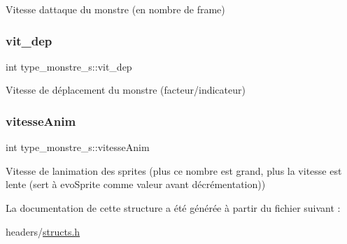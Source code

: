 Vitesse d\textquotesingle{}attaque du monstre (en nombre de frame) \mbox{\label{structtype__monstre__s_a768470695da3d9377f1e7e97a3c45ed7}} 
\subsubsection{\texorpdfstring{vit\+\_\+dep}{vit\_dep}}
{\footnotesize\ttfamily int type\+\_\+monstre\+\_\+s\+::vit\+\_\+dep}

Vitesse de déplacement du monstre (facteur/indicateur) \mbox{\label{structtype__monstre__s_a125257fd616cb7a0a4c82ae30f7d849e}} 
\subsubsection{\texorpdfstring{vitesse\+Anim}{vitesseAnim}}
{\footnotesize\ttfamily int type\+\_\+monstre\+\_\+s\+::vitesse\+Anim}

Vitesse de l\textquotesingle{}animation des sprites (plus ce nombre est grand, plus la vitesse est lente (sert à evo\+Sprite comme valeur avant décrémentation)) 

La documentation de cette structure a été générée à partir du fichier suivant \+:\begin{DoxyCompactItemize}
\item 
headers/\hyperlink{structs_8h}{structs.\+h}\end{DoxyCompactItemize}
